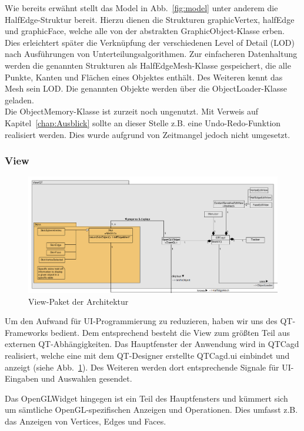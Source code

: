 Wie bereits erwähnt stellt das Model in Abb.~\ref{fig:model} unter anderem die HalfEdge-Struktur bereit. 
Hierzu dienen die Strukturen graphicVertex, halfEdge und graphicFace, welche alle von der abstrakten GraphicObject-Klasse erben. 
Dies erleichtert später die Verknüpfung der verschiedenen Level of Detail (LOD) nach Ausführungen von Unterteilungsalgorithmen. 
Zur einfacheren Datenhaltung werden die genannten Strukturen als HalfEdgeMesh-Klasse gespeichert, die alle Punkte, Kanten und Flächen eines Objektes enthält. 
Des Weiteren kennt das Mesh sein LOD. 
Die genannten Objekte werden über die ObjectLoader-Klasse geladen.\\

Die ObjectMemory-Klasse ist zurzeit noch ungenutzt. 
Mit Verweis auf Kapitel~\ref{chap:Ausblick} sollte an dieser Stelle z.B. eine Undo-Redo-Funktion realisiert werden. 
Dies wurde aufgrund von Zeitmangel jedoch nicht umgesetzt.

\subsubsection{View}
\begin{figure}[htbp]
\centering
\includegraphics[angle=90,scale=0.6]{content/pictures/architekturView.png}
\caption{View-Paket der Architektur}
\label{fig:view}
\end{figure}

Um den Aufwand für UI-Programmierung zu reduzieren, haben wir uns des QT-Frameworks bedient. 
Dem entsprechend besteht die View zum grö\ss{}ten Teil aus externen QT-Abhängigkeiten. 
Das Hauptfenster der Anwendung wird in QTCagd realisiert, welche eine mit dem QT-Designer erstellte QTCagd.ui einbindet und anzeigt (siehe Abb.~\ref{fig:view}).
Des Weiteren werden dort entsprechende Signale für UI-Eingaben und Auswahlen gesendet.

Das OpenGLWidget hingegen ist ein Teil des Hauptfensters und kümmert sich um sämtliche OpenGL-spezifischen Anzeigen und Operationen.
Dies umfasst z.B. das Anzeigen von Vertices, Edges und Faces. 

